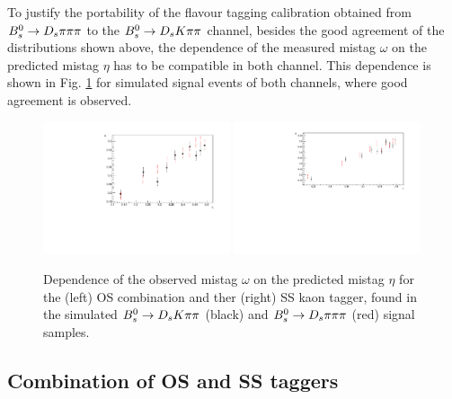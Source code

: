 To justify the portability of the flavour tagging calibration obtained from ${{B}^0_{s}}\rightarrow{\ensuremath{{D}_{s}}}{\ensuremath{\pi}}{\ensuremath{\pi}}{\ensuremath{\pi}}$ to the ${{B}^0_{s}}\rightarrow{\ensuremath{{D}_{s}}}{\ensuremath{K}}{\ensuremath{\pi}}{\ensuremath{\pi}}$ channel, 
besides the good agreement of the distributions shown above, the dependence of the measured mistag $\omega$ on the predicted mistag $\eta$ has to be compatible in both channel.
This dependence is shown in Fig. \ref{fig:etavsW_mc_comparison} for simulated signal events of both channels, where good agreement is observed. 

\begin{figure}[h]
\includegraphics[height=7.cm,width=0.49\textwidth]{figs/Tagging/OS_combination_MCcomparison.pdf}
\includegraphics[height=7.cm,width=0.49\textwidth]{figs/Tagging/SS_nnetKaon_MCcomparison.pdf}
\caption{Dependence of the observed mistag $\omega$ on the predicted mistag $\eta$ for the (left) OS combination and ther (right) SS kaon tagger, 
found in the simulated ${{B}^0_{s}}\rightarrow{\ensuremath{{D}_{s}}}{\ensuremath{K}}{\ensuremath{\pi}}{\ensuremath{\pi}}$ (black) and ${{B}^0_{s}}\rightarrow{\ensuremath{{D}_{s}}}{\ensuremath{\pi}}{\ensuremath{\pi}}{\ensuremath{\pi}}$ (red) signal samples.}
\label{fig:etavsW_mc_comparison}
\end{figure}


\subsection{Combination of OS and SS taggers}
\label{subsec: TaggingCombination}

